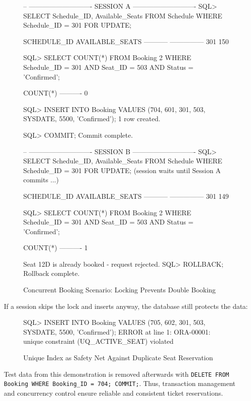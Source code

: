 \documentclass[12pt,a4paper]{article}
\begin{document}
\begin{figure}[H]
\begin{terminal}
-- ---------------------------- SESSION A ----------------------------
SQL> SELECT Schedule_ID, Available_Seats FROM Schedule WHERE Schedule_ID = 301 FOR UPDATE;

SCHEDULE_ID AVAILABLE_SEATS
----------- ---------------
        301             150

SQL> SELECT COUNT(*) FROM Booking
  2  WHERE Schedule_ID = 301 AND Seat_ID = 503 AND Status = 'Confirmed';

  COUNT(*)
----------
         0

SQL> INSERT INTO Booking VALUES (704, 601, 301, 503, SYSDATE, 5500, 'Confirmed');
1 row created.

SQL> COMMIT;
Commit complete.

-- ---------------------------- SESSION B ----------------------------
SQL> SELECT Schedule_ID, Available_Seats FROM Schedule WHERE Schedule_ID = 301 FOR UPDATE;
        (session waits until Session A commits ...)

SCHEDULE_ID AVAILABLE_SEATS
----------- ---------------
        301             149

SQL> SELECT COUNT(*) FROM Booking
  2  WHERE Schedule_ID = 301 AND Seat_ID = 503 AND Status = 'Confirmed';

  COUNT(*)
----------
         1

Seat 12D is already booked - request rejected.
SQL> ROLLBACK;
Rollback complete.
\end{terminal}
\caption{Concurrent Booking Scenario: Locking Prevents Double Booking}
\end{figure}
If a session skips the lock and inserts anyway, the database still protects the data:
\begin{figure}[H]
\begin{terminal}
SQL> INSERT INTO Booking VALUES (705, 602, 301, 503, SYSDATE, 5500, 'Confirmed');
ERROR at line 1:
ORA-00001: unique constraint (UQ_ACTIVE_SEAT) violated
\end{terminal}
\caption{Unique Index as Safety Net Against Duplicate Seat Reservation}
\end{figure}
Test data from this demonstration is removed afterwards with \texttt{DELETE FROM Booking WHERE Booking\_ID
= 704; COMMIT;}. Thus, transaction management and concurrency control ensure reliable and consistent
ticket reservations.

\end{document}
